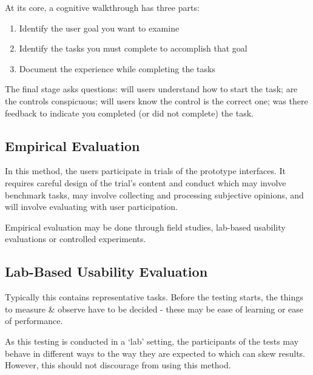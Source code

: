 At its core, a cognitive walkthrough has three parts:
\begin{enumerate}
    \item Identify the user goal you want to examine
    \item Identify the tasks you must complete to accomplish that goal
    \item Document the experience while completing the tasks
\end{enumerate}
The final stage asks questions: will users understand how to start the task; are the controls conspicuous; will users know the control is the correct one; was there feedback to indicate you completed (or did not complete) the task.

\subsection*{Empirical Evaluation}
In this method, the users participate in trials of the prototype interfaces. It requires careful design of the trial's content and conduct which may involve benchmark tasks, may involve collecting and processing subjective opinions, and will involve evaluating with user participation.

Empirical evaluation may be done through field studies, lab-based usability evaluations or controlled experiments.

\subsection*{Lab-Based Usability Evaluation}
Typically this contains representative tasks. Before the testing starts, the things to measure \& observe have to be decided - these may be ease of learning or ease of performance.

As this testing is conducted in a `lab' setting, the participants of the tests may behave in different ways to the way they are expected to which can skew results. However, this should not discourage from using this method.